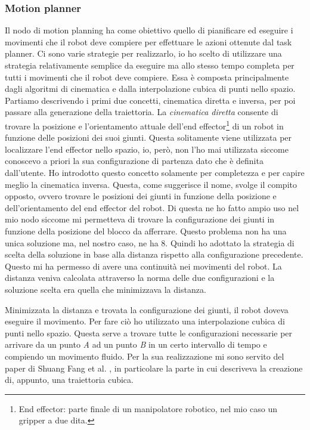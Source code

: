 \subsubsection{Motion planner}
\label{subsubsec:motionplanner}
Il nodo di motion planning ha come obiettivo quello di pianificare ed eseguire i movimenti che il robot deve compiere per effettuare le azioni ottenute dal task planner.
Ci sono varie strategie per realizzarlo, io ho scelto di utilizzare una strategia relativamente semplice da eseguire ma allo stesso tempo completa per tutti i movimenti che il robot deve compiere. Essa è composta principalmente dagli algoritmi di cinematica e  dalla interpolazione cubica di punti nello spazio.
Partiamo descrivendo i primi due concetti, cinematica diretta e inversa, per poi passare alla generazione della traiettoria.
La \textit{cinematica diretta} consente di trovare la posizione e l'orientamento attuale dell'end effector\footnote{End effector: parte finale di un manipolatore robotico, nel mio caso un gripper a due dita.} di un robot in funzione delle posizioni dei suoi giunti. 
Questa solitamente viene utilizzata per localizzare l'end effector nello spazio, io, però, non l'ho mai utilizzata siccome conoscevo a priori la sua configurazione di partenza dato che è definita dall'utente. Ho introdotto questo concetto solamente per completezza e per capire meglio la cinematica inversa.
Questa, come suggerisce il nome, svolge il compito opposto, ovvero trovare le posizioni dei giunti in funzione della posizione e dell'orientamento del end effector del robot.
Di questa ne ho fatto ampio uso nel mio nodo siccome mi permetteva di trovare la configurazione dei giunti in funzione della posizione del blocco da afferrare.
Questo problema non ha una unica soluzione ma, nel nostro caso, ne ha 8. Quindi ho adottato la strategia di scelta della soluzione in base alla distanza rispetto alla configurazione precedente. Questo mi ha permesso di avere una continuità nei movimenti del robot.
La distanza veniva calcolata attraverso la norma delle due configurazioni e la soluzione scelta era quella che minimizzava la distanza.

Minimizzata la distanza e trovata la configurazione dei giunti, il robot doveva eseguire il movimento. Per fare ciò ho utilizzato una interpolazione cubica di punti nello spazio. Questa serve a trovare tutte le configurazioni necessarie per arrivare da un punto \textit{A} ad un punto \textit{B} in un certo intervallo di tempo e compiendo un movimento fluido. 
Per la sua realizzazione mi sono servito del paper di Shuang Fang et al. \cite{8941347}, in particolare la parte in cui descriveva la creazione di, appunto, una traiettoria cubica.

